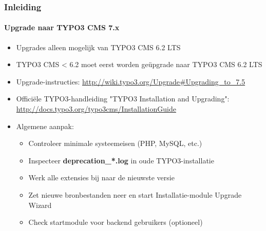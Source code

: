 \begin{frame}[fragile]
	\frametitle{Inleiding}
	\framesubtitle{Upgrade naar TYPO3 CMS 7.x}

	\begin{itemize}
		\item Upgrades alleen mogelijk van TYPO3 CMS 6.2 LTS
		\item TYPO3 CMS < 6.2 moet eerst worden geüpgrade naar TYPO3 CMS 6.2 LTS
	\end{itemize}

	\begin{itemize}

		\item Upgrade-instructies:\newline
			\smaller\url{http://wiki.typo3.org/Upgrade#Upgrading_to_7.5}\normalsize
		\item Officiële TYPO3-handleiding "TYPO3 Installation and Upgrading":
			\smaller\url{http://docs.typo3.org/typo3cms/InstallationGuide}\normalsize
		\item Algemene aanpak:
			\begin{itemize}
				\item Controleer minimale systeemeisen (PHP, MySQL, etc.)
				\item Inspecteer \textbf{deprecation\_*.log} in oude TYPO3-installatie
				\item Werk alle extensies bij naar de nieuwste versie
				\item Zet nieuwe bronbestanden neer en start\newline
					Installatie-module \textrightarrow Upgrade Wizard
				\item Check startmodule voor backend gebruikers (optioneel)
			\end{itemize}
	\end{itemize}

\end{frame}

